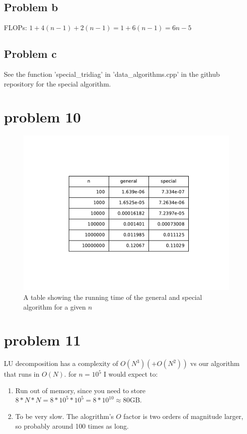 \documentclass[english,notitlepage]{revtex4-1}  %
\begin{document}
	\subsection*{Problem b}
		FLOPs: $1 + 4(n-1) + 2(n-1) = 1 + 6(n-1) = 6n - 5$
	\subsection*{Problem c}
	See the function 'special\_tridiag' in 'data\_algorithms.cpp' in the github repository for the special algorithm.



\section*{problem 10}
	\begin{figure}[H]
		\centering
		\includegraphics[scale=0.75]{plots/cmp_gen_spec.pdf} %
		\caption{A table showing the running time of the general and special algorithm for a given $n$}
		\label{fig:cmp_gen_spec}
	\end{figure}


\section*{problem 11}
LU decomposition has a complexity of $O(N^3) (+O(N^2))$ vs our algorithm that runs in $O(N)$. for $n=10^5$ I would expect to: \\
\begin{enumerate}
	\item Run out of memory, since you need to store $8*N*N = 8*10^5*10^5 = 8*10^{10} \approx 80$GB.
	\item To be very slow. The alogrithm's $O$ factor is two orders of magnitude larger, so probably around 100 times as long.
\end{enumerate}
\end{document}

